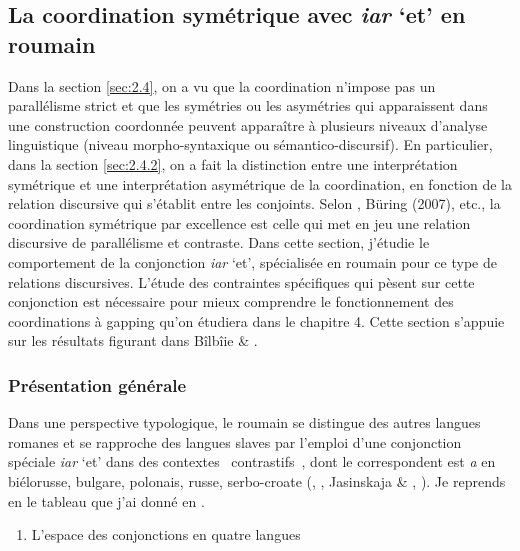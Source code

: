 \subsection{La coordination symétrique avec \textit{iar} `et' en roumain }
\label{bkm:Ref302035451}\label{bkm:Ref300182216}Dans la section \ref{sec:2.4}, on a vu que la coordination n'impose pas un parallélisme strict et que les symétries ou les asymétries qui apparaissent dans une construction coordonnée peuvent apparaître à plusieurs niveaux d'analyse linguistique (niveau morpho-syntaxique ou sémantico-discursif). En particulier, dans la section \ref{sec:2.4.2}, on a fait la distinction entre une interprétation symétrique et une interprétation asymétrique de la coordination, en fonction de la relation discursive qui s'établit entre les conjoints. Selon \citet{Abraham2006}, Büring (2007), etc., la coordination symétrique par excellence est celle qui met en jeu une relation discursive de parallélisme et contraste. Dans cette section, j'étudie le comportement de la conjonction \textit{iar} `et', spécialisée en roumain pour ce type de relations discursives. L'étude des contraintes spécifiques qui pèsent sur cette conjonction est nécessaire pour mieux comprendre le fonctionnement des coordinations à gapping qu'on étudiera dans le chapitre 4. Cette section s'appuie sur les résultats figurant dans Bîlbîie \& \citet{Winterstein2011}.

\subsubsection{Présentation générale}
\label{bkm:Ref302038810}Dans une perspective typologique, le roumain se distingue des autres langues romanes et se rapproche des langues slaves par l'emploi d'une conjonction spéciale \textit{iar} `et' dans des contextes {\guillemotleft}~contrastifs~{\guillemotright}, dont le correspondent est \textit{a} en biélorusse, bulgare, polonais, russe, serbo-croate (\citet{Niculescu1965}, \citet{Mauri2008}, Jasinskaja \& \citet{Zeevat2009}, \citet{Repp2009}). Je reprends en  le tableau que j'ai donné en .  


\begin{enumerate}
\item   \label{bkm:Ref301962063}L'espace des conjonctions en quatre langues


\end{enumerate}

